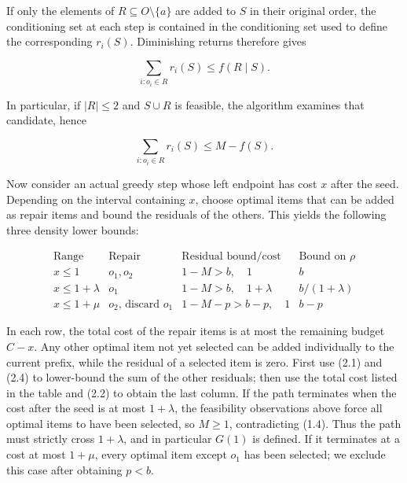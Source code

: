 \documentclass[11pt,a4paper]{article}
\begin{document}
If only the elements of $R\subseteq O\setminus\{a\}$ are added to $S$ in their original order, the conditioning set at each step is contained in the conditioning set used to define the corresponding $r_i(S)$. Diminishing returns therefore gives

\begin{equation}
\sum_{i:o_i\in R}r_i(S)\le f(R\mid S).
\tag{2.3}
\end{equation}

In particular, if $|R|\le2$ and $S\cup R$ is feasible, the algorithm examines that candidate, hence

\begin{equation}
\sum_{i:o_i\in R}r_i(S)\le M-f(S).
\tag{2.4}
\end{equation}

Now consider an actual greedy step whose left endpoint has cost $x$ after the seed. Depending on the interval containing $x$, choose optimal items that can be added as repair items and bound the residuals of the others. This yields the following three density lower bounds:

\begin{equation}
\begin{array}{c|c|c|c}
\text{Range}&\text{Repair}&\text{Residual bound/cost}&\text{Bound on }\rho\\\hline
x\le1&o_1,o_2&1-M>b,\quad1&b\\
x\le1+\lambda&o_1&1-M>b,\quad1+\lambda&b/(1+\lambda)\\
x\le1+\mu&o_2\text{, discard }o_1&1-M-p>b-p,\quad1&b-p
\end{array}
\tag{2.5}
\end{equation}

In each row, the total cost of the repair items is at most the remaining budget $C-x$. Any other optimal item not yet selected can be added individually to the current prefix, while the residual of a selected item is zero. First use (2.1) and (2.4) to lower-bound the sum of the other residuals; then use the total cost listed in the table and (2.2) to obtain the last column.
If the path terminates when the cost after the seed is at most $1+\lambda$, the feasibility observations above force all optimal items to have been selected, so $M\ge1$, contradicting (1.4). Thus the path must strictly cross $1+\lambda$, and in particular $G(1)$ is defined. If it terminates at a cost at most $1+\mu$, every optimal item except $o_1$ has been selected; we exclude this case after obtaining $p<b$.
\end{document}
